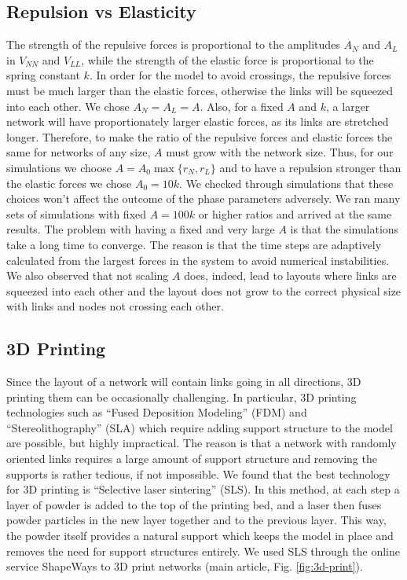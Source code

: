 \documentclass[linenumbers,endfloats,nofootinbib,preprint,floatfix,titlepage,superscriptaddress]{revtex4-1} %
\begin{document}
\subsection{Repulsion vs Elasticity}
The strength of the repulsive forces is proportional to the amplitudes $A_N$ and $A_L$ in $V_{NN}$ and $V_{LL}$, while the  strength of the elastic force is proportional to the spring constant $k$. 
In order for the model to avoid crossings, the repulsive forces must be  much larger than the elastic forces, otherwise the links will be squeezed into each other. 
We chose $A_N=A_L = A$.
Also, for a fixed $A$ and $k$, a larger network will have proportionately larger elastic forces, as its links are stretched longer. 
Therefore, to make the ratio of the repulsive forces and elastic forces the same for networks of any size, $A$ must grow with the network size. 
Thus, for our simulations we choose $A = A_0 \max\{r_N, r_L\}$ and to have a repulsion stronger than the elastic forces we chose $A_0 = 10 k$. 
We checked through simulations that these choices won't affect the outcome of the phase parameters adversely. 
We ran many sets of simulations with fixed $A = 100k $ or higher ratios and arrived at the same results. 
The problem with having a fixed and very large $A$ is that the simulations take a long time to converge. 
The reason is that the time steps are adaptively calculated from the largest forces in the system to avoid numerical instabilities. 
We also observed that not scaling $A$ does, indeed, lead to layouts where links are squeezed into each other and the layout does not grow to the correct physical size with links and nodes not crossing each other.  

\subsection{3D Printing}
Since the layout of a network will contain links going in all directions, 3D printing them can be occasionally challenging. 
In particular, 3D printing technologies such as ``Fused Deposition Modeling'' (FDM) and ``Stereolithography'' (SLA) which require adding support structure to the model are possible, but highly impractical. 
The reason is that a network with randomly oriented links requires a large amount of support structure and removing the supports is rather tedious, if not impossible. 
We found that the best technology for 3D printing is ``Selective laser sintering'' (SLS). 
In this method, at each step a layer of powder is added to the top of the printing bed, and a laser then fuses powder particles in the new layer together and to the previous layer. 
This way, the powder itself provides a natural support which keeps the model in place and removes the need for support structures entirely.
We used SLS through the online service ShapeWays to 3D print networks (main article, Fig. \ref{fig:3d-print}). 
\end{document}
